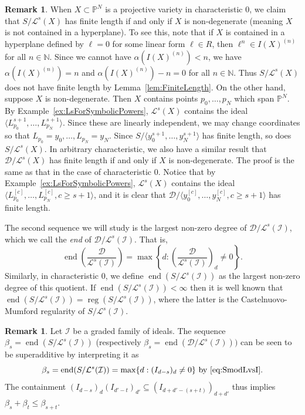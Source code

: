 \documentclass[12pt, reqno]{amsart}
\numberwithin{equation}{section}
\def\b{\ensuremath{\beta}}
\newcommand{\N}{{\mathbb N}}
\renewcommand{\P}{{\mathbb P}}
\newcommand{\cL}{{\mathcal L}}
\newcommand{\I}{{\mathcal I}}
\renewcommand{\L}{{\mathcal L}}
\DeclareMathOperator{\reg}{reg}
\DeclareMathOperator{\soc}{end}
\theoremstyle{plain} %
\theoremstyle{definition}
\newtheorem{rem}[thm]{Remark}
\theoremstyle{remark}
\renewcommand{\L}{\mathcal{L}}
\begin{document}
\begin{rem}\label{ex:LsFiniteLengthProjectiveVariety}
When $X\subset \P^N$ is a projective variety in characteristic $0$, we claim that $S/\cL^s(X)$ has finite length if and only if $X$ is non-degenerate (meaning $X$ is not contained in a hyperplane).  To see this, note that if $X$ is contained in a hyperplane defined by $\ell=0$ for some linear form $\ell\in R$, then $\ell^n\in I(X)^{(n)}$ for all $n\in\N$.  Since we cannot have $\alpha(I(X)^{(n)})<n$, we have $\alpha(I(X)^{(n)})=n$ and $\alpha(I(X)^{(n)})-n= 0$ for all $n\in\N$.  Thus $S/\cL^s(X)$ does not have finite length by Lemma~\ref{lem:FiniteLength}.  On the other hand, suppose $X$ is non-degenerate.  Then $X$ contains points $p_0,\ldots,p_N$ which span $\P^N$.  By Example~\ref{ex:LsForSymbolicPowers}, $\cL^s(X)$ contains the ideal $\langle L_{p_0}^{s+1},\ldots,L_{p_N}^{s+1}\rangle$.  Since these are linearly independent, we may change coordinates so that $L_{p_0}=y_0,\ldots,L_{p_N}=y_N$.  Since $S/\langle y_0^{s+1},\ldots,y_N^{s+1}\rangle$ has finite length, so does $S/\cL^s(X)$. In arbitrary characteristic, we also have a similar result that $\mathcal{D}/\cL^s(X)$ has finite length if and only if $X$ is non-degenerate. The proof is the same as that in the case of characteristic $0$.  Notice that by Example~\ref{ex:LsForSymbolicPowers}, $\cL^s(X)$ contains the ideal $\langle L_{p_0}^{[c]},\ldots,L_{p_N}^{[c]}, c\ge s+1\rangle$, and it is clear that $\mathcal{D}/\langle y_0^{[c]},\ldots,y_N^{[c]}, c\ge s+1\rangle$ has finite length. 
\end{rem}

The second sequence we will study is the largest non-zero degree of $\mathcal{D}/\cL^s(\I)$, which we call the \textit{end} of $\mathcal{D}/\cL^s(\I)$. That is,
\[
\soc\left(\frac{\mathcal{D}}{\cL^s(\I)}\right)=\max\left\lbrace d : \left(\frac{\mathcal{D}}{\cL^s(\I)}\right)_d\neq 0\right\rbrace.
\]
Similarly, in characteristic $0$, we define $\soc(S/\cL^s(\I))$ as the largest non-zero degree of this quotient.  If $\soc(S/\cL^s(\I))<\infty$ then it is well known that $\soc(S/\cL^s(\I))=\reg(S/\cL^s(\I))$, where the latter is the Castelnuovo-Mumford regularity of $S/\cL^s(\I)$.

\begin{rem}
\label{rem:betasuperadditive}
Let $\I$ be a graded family of ideals. The sequence $\beta_s=\soc(S/\L^s(\I))$ (respectively $\beta_s=\soc(\mathcal{D}/\L^s(\I)))$ can be seen to be superadditive by interpreting it as
\[
\beta_s=\soc(S/\L^s(\I))=\max\{ d: (I_{d-s})_d\neq 0\} \text{ by } \eqref{eq:SmodLvsI}.
\]
The containment $(I_{d-s})_d(I_{d'-t})_{d'}\subseteq (I_{d+d'-(s+t)})_{d+d'}$ thus implies $\b_s+\b_t\leq \b_{s+t}$.
\end{rem}
\end{document}
